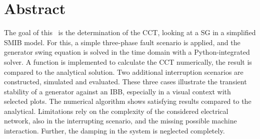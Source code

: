 
\cleardoublepage
\pagestyle{empty}




\section*{Abstract}

The goal of this \arbeit~is the determination of the \acf{CCT}, looking at a \acf{SG} in a simplified \acf{SMIB} model. For this, a simple three-phase fault scenario is applied, and the generator swing equation is solved in the time domain with a Python-integrated solver. A function is implemented to calculate the \acs{CCT} numerically, the result is compared to the analytical solution. Two additional interruption scenarios are constructed, simulated and evaluated. These three cases illustrate the transient stability of a generator against an \acf{IBB}, especially in a visual context with selected plots. The numerical algorithm shows satisfying results compared to the analytical. Limitations rely on the complexity of the considered electrical network, also in the interrupting scenario, and the missing possible machine interaction. Further, the damping in the system is neglected completely.

